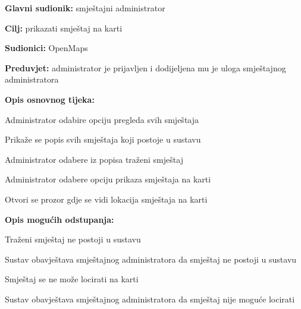                         \noindent {}
					\begin{packed_item}
	
						\item \textbf{Glavni sudionik: }smještajni administrator
						\item  \textbf{Cilj:} prikazati smještaj na karti
						\item  \textbf{Sudionici:} OpenMaps
						\item  \textbf{Preduvjet:} administrator je prijavljen i dodijeljena mu je uloga smještajnog administratora
						\item  \textbf{Opis osnovnog tijeka:}
						
						\item[] \begin{packed_enum}
	
							\item Administrator odabire opciju pregleda svih smještaja
							\item Prikaže se popis svih smještaja koji postoje u sustavu
							\item Administrator odabere iz popisa traženi smještaj
							\item Administrator odabere opciju prikaza smještaja na karti
							\item Otvori se prozor gdje se vidi lokacija smještaja na karti
						\end{packed_enum}
						
						\item  \textbf{Opis mogućih odstupanja:}
						
						\item[] \begin{packed_item}
	
							\item[3.a] Traženi smještaj ne postoji u sustavu
							\item[] \begin{packed_enum}
								
								\item Sustav obavještava smještajnog administratora da smještaj ne postoji u sustavu
								
							\end{packed_enum}
							\item[4.a] Smještaj se ne može locirati na karti
							\item[] \begin{packed_enum}
								
								\item Sustav obavještava smještajnog administratora da smještaj nije moguće locirati
								
							\end{packed_enum}
							
						\end{packed_item}
					\end{packed_item}


